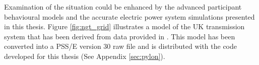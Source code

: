 Examination of the situation could be enhanced by the advanced participant
behavioural models and the accurate electric power system simulations
presented in this thesis.  Figure \ref{fig:ngt_grid} illustrates a model of
the UK transmission system that has been derived from data provided in
.  This model has been converted into a PSS/E version 30 raw
file and is distributed with the code developed for this thesis (See Appendix
\ref{sec:pylon}).



